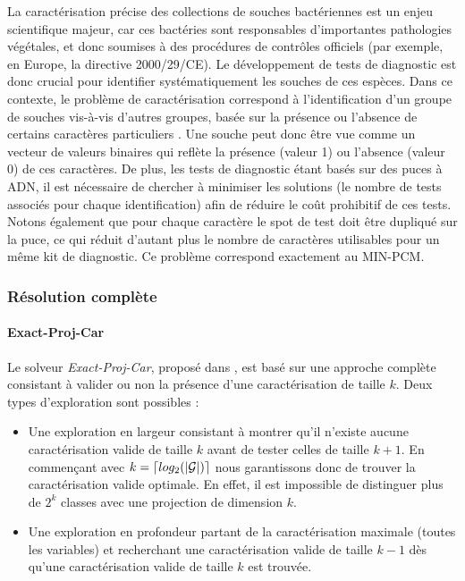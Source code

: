 \documentclass[a4paper,10pt]{article}
\begin{document}
La caractérisation précise des collections de souches bactériennes est un enjeu
scientifique majeur, car ces bactéries sont responsables d'importantes
pathologies végétales, et donc soumises à des procédures de contrôles officiels
(par exemple, en Europe, la directive 2000/29/CE). Le développement de tests de
diagnostic est donc crucial pour identifier systématiquement les
souches de ces espèces. Dans ce contexte, le problème de caractérisation
correspond à l'identification d'un groupe de souches vis-à-vis d'autres groupes,
basée sur la présence ou l'absence de certains caractères particuliers
\cite{plos}. Une souche peut donc être vue comme un vecteur de valeurs binaires
qui reflète la présence (valeur 1) ou l'absence (valeur 0) de ces caractères. De
plus, les tests de diagnostic étant basés sur des puces à ADN, il est nécessaire
de chercher à minimiser les solutions (le nombre de tests associés pour chaque
identification) afin de réduire le coût prohibitif de ces tests. Notons également que pour chaque caractère le spot de test doit être dupliqué sur la puce, ce qui réduit d'autant plus le nombre de caractères utilisables pour un même kit de diagnostic. Ce problème correspond exactement au MIN-PCM.

\subsubsection{Résolution complète}
\paragraph{Exact-Proj-Car}
Le solveur \emph{Exact-Proj-Car}, proposé dans \cite{sac12}, est basé sur une approche complète consistant à valider ou non la présence d'une caractérisation de taille $k$. Deux types d'exploration sont possibles :
\begin{itemize}
 \item Une exploration en largeur consistant à montrer qu'il n'existe aucune caractérisation valide de taille $k$ avant de tester celles de taille $k+1$. En commençant avec $k= \lceil
log_2(|\cal{G}|)\rceil$ nous garantissons donc de trouver la caractérisation valide optimale. En effet, il est impossible de distinguer plus de $2^k$ classes avec une projection de dimension $k$.
 \item Une exploration en profondeur partant de la caractérisation maximale (toutes les variables) et recherchant une caractérisation valide de taille $k-1$ dès qu'une caractérisation valide de taille $k$ est trouvée.
\end{itemize}
\end{document}
